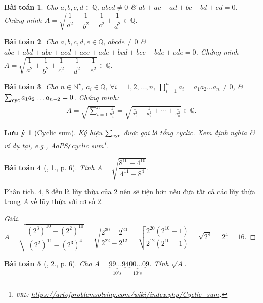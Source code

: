 \documentclass{article}
\newtheorem{baitoan}{Bài toán}
\newtheorem{luuy}{Lưu ý}
\begin{document}
\begin{baitoan}
	Cho $a,b,c,d\in\mathbb{Q}$, $abcd\ne0$ \& $ab + ac + ad + bc + bd + cd = 0$. Chứng minh $A = \sqrt{\dfrac{1}{a^2} + \dfrac{1}{b^2} + \dfrac{1}{c^2} + \dfrac{1}{d^2}}\in\mathbb{Q}$.
\end{baitoan}

\begin{baitoan}
	Cho $a,b,c,d,e\in\mathbb{Q}$, $abcde\ne0$ \& $abc + abd + abe + acd + ace + ade + bcd + bce + bde + cde = 0$. Chứng minh $A = \sqrt{\dfrac{1}{a^2} + \dfrac{1}{b^2} + \dfrac{1}{c^2} + \dfrac{1}{d^2} + \dfrac{1}{e^2}}\in\mathbb{Q}$.
\end{baitoan}

\begin{baitoan}
	Cho $n\in\mathbb{N}^\star$, $a_i\in\mathbb{Q}$, $\forall i = 1,2,\ldots,n$, $\prod_{i=1}^n a_i = a_1a_2\ldots a_n\ne0$, \& $\sum_{\rm cyc} a_1a_2\ldots a_{n-2} = 0$. Chứng minh:
	\begin{align*}
		A = \sqrt{\sum_{i=1}^n \frac{1}{a_i^2}} = \sqrt{\frac{1}{a_1^2} + \frac{1}{a_2^2} + \cdots + \frac{1}{a_n^2}}\in\mathbb{Q}.
	\end{align*}
\end{baitoan}

\begin{luuy}[Cyclic sum]
	Ký hiệu $\sum_{\rm cyc}$ được gọi là tổng cyclic. Xem định nghĩa \& ví dụ tại, e.g., \href{https://artofproblemsolving.com/wiki/index.php/Cyclic_sum}{AoPS\emph{\texttt{/}}cyclic sum}\footnote{\textsc{url}: \url{https://artofproblemsolving.com/wiki/index.php/Cyclic_sum}.}.
\end{luuy}

\begin{baitoan}[\cite{Tuyen_Toan_9}, 1., p. 6]
	Tính $A = \sqrt{\dfrac{8^{10} - 4^{10}}{4^{11} - 8^4}}$.
\end{baitoan}
\noindent\textsf{Phân tích.} $4,8$ đều là lũy thừa của $2$ nên sẽ tiện hơn nếu đưa tất cả các lũy thừa trong $A$ về lũy thừa với cơ số 2.

\begin{proof}[Giải]
	$A = \sqrt{\dfrac{(2^3)^{10} - (2^2)^{10}}{(2^2)^{11} - (2^3)^4}} = \sqrt{\dfrac{2^{30} - 2^{20}}{2^{22} - 2^{12}}} = \sqrt{\dfrac{2^{20}(2^{10} - 1)}{2^{12}(2^{10} - 1)}} = \sqrt{2^8} = 2^4 = 16$.
\end{proof}

\begin{baitoan}[\cite{Tuyen_Toan_9}, 2., p. 6]
	Cho $A = \underbrace{99\ldots9}_{10's}4\underbrace{00\ldots0}_{10's}9$. Tính $\sqrt{A}$.
\end{baitoan}
\end{document}
